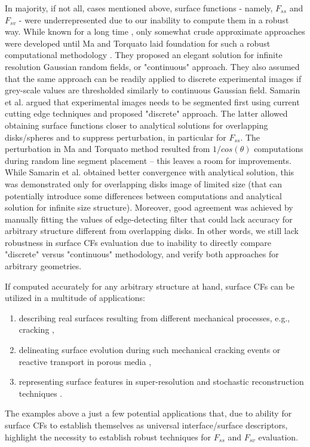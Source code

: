 \documentclass[preprint]{elsarticle}
\begin{document}
In majority, if not all, cases mentioned above, surface functions - namely,
$F_{ss}$ and $F_{sv}$ - were underrepresented due to our inability to compute
them in a robust way. While known for a long time \cite{dietrich1995scattering}, only
somewhat crude approximate approaches \cite{seaton1986spatial} were developed
until Ma and Torquato laid foundation for such a robust computational
methodology \cite{ma2018SS}. They proposed an elegant solution for infinite
resolution Gaussian random fields, or "continuous" approach. They also assumed
that the same approach can be readily applied to discrete experimental images if
grey-scale values are thresholded similarly to continuous Gaussian
field. Samarin et al. \cite{Samarin} argued that experimental images needs
to be segmented first using current cutting edge techniques \cite{NNseg} and
proposed "discrete" approach. The latter allowed obtaining surface functions
closer to analytical solutions for overlapping disks/spheres and to suppress
perturbation, in particular for $F_{ss}$. The perturbation in Ma and Torquato
method resulted from $1/cos(\theta)$ computations during random line segment
placement -- this leaves a room for improvements. While Samarin et al. obtained
better convergence with analytical solution, this was demonstrated only for
overlapping disks image of limited size (that can potentially introduce some
differences between computations and analytical solution for infinite size
structure). Moreover, good agreement was achieved by manually fitting the values
of edge-detecting filter that could lack accuracy for arbitrary structure
different from overlapping disks. In other words, we still lack robustness in
surface CFs evaluation due to inability to directly compare "discrete" versus
"continuous" methodology, and verify both approaches for arbitrary geometries.

If computed accurately for any arbitrary structure at hand, surface CFs can be
utilized in a multitude of applications:
\begin{enumerate}
  \item describing real surfaces resulting from different mechanical processes,
    e.g., cracking \cite{hansen1991roughness,akhavan2012quantifying},
  \item delineating surface evolution \cite{chen2022} during such mechanical
    cracking events or reactive transport in porous media
    \cite{godinho2016,noiriel2021,prokhorov2022},
  \item representing surface features in super-resolution and stochastic
    reconstruction techniques \cite{chen2020super,janssens2020,karimpouli2022}.
\end{enumerate}
The examples above a just a few potential applications that, due to ability for
surface CFs to establish themselves as universal interface/surface descriptors,
highlight the necessity to establish robust techniques for $F_{ss}$ and $F_{sv}$
evaluation.
\end{document}
